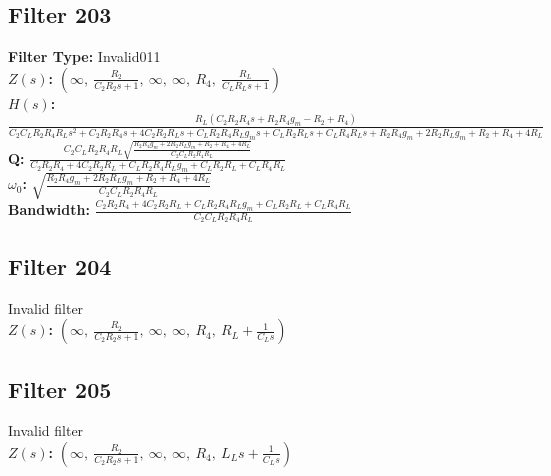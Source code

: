 \documentclass{article}
\begin{document}
\subsection*{Filter 203}
\textbf{Filter Type:} Invalid011 \\ 
\textbf{$Z(s)$:} $\left( \infty, \  \frac{R_{2}}{C_{2} R_{2} s + 1}, \  \infty, \  \infty, \  R_{4}, \  \frac{R_{L}}{C_{L} R_{L} s + 1}\right)$ \\ 
\textbf{$H(s)$:} $\frac{R_{L} \left(C_{2} R_{2} R_{4} s + R_{2} R_{4} g_{m} - R_{2} + R_{4}\right)}{C_{2} C_{L} R_{2} R_{4} R_{L} s^{2} + C_{2} R_{2} R_{4} s + 4 C_{2} R_{2} R_{L} s + C_{L} R_{2} R_{4} R_{L} g_{m} s + C_{L} R_{2} R_{L} s + C_{L} R_{4} R_{L} s + R_{2} R_{4} g_{m} + 2 R_{2} R_{L} g_{m} + R_{2} + R_{4} + 4 R_{L}}$ \\ 
\textbf{Q:} $\frac{C_{2} C_{L} R_{2} R_{4} R_{L} \sqrt{\frac{R_{2} R_{4} g_{m} + 2 R_{2} R_{L} g_{m} + R_{2} + R_{4} + 4 R_{L}}{C_{2} C_{L} R_{2} R_{4} R_{L}}}}{C_{2} R_{2} R_{4} + 4 C_{2} R_{2} R_{L} + C_{L} R_{2} R_{4} R_{L} g_{m} + C_{L} R_{2} R_{L} + C_{L} R_{4} R_{L}}$ \\ 
\textbf{$\omega_0$:} $\sqrt{\frac{R_{2} R_{4} g_{m} + 2 R_{2} R_{L} g_{m} + R_{2} + R_{4} + 4 R_{L}}{C_{2} C_{L} R_{2} R_{4} R_{L}}}$ \\ 
\textbf{Bandwidth:} $\frac{C_{2} R_{2} R_{4} + 4 C_{2} R_{2} R_{L} + C_{L} R_{2} R_{4} R_{L} g_{m} + C_{L} R_{2} R_{L} + C_{L} R_{4} R_{L}}{C_{2} C_{L} R_{2} R_{4} R_{L}}$ \\ 
\subsection*{Filter 204}
Invalid filter \\ 
\textbf{$Z(s)$:} $\left( \infty, \  \frac{R_{2}}{C_{2} R_{2} s + 1}, \  \infty, \  \infty, \  R_{4}, \  R_{L} + \frac{1}{C_{L} s}\right)$ \\ 
\subsection*{Filter 205}
Invalid filter \\ 
\textbf{$Z(s)$:} $\left( \infty, \  \frac{R_{2}}{C_{2} R_{2} s + 1}, \  \infty, \  \infty, \  R_{4}, \  L_{L} s + \frac{1}{C_{L} s}\right)$ \\ 
\end{document}
